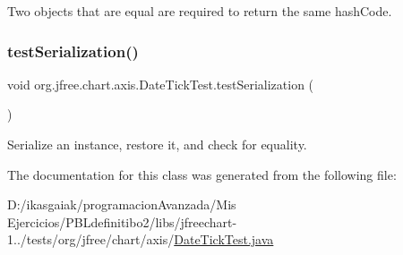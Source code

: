 Two objects that are equal are required to return the same hash\+Code. \mbox{\label{classorg_1_1jfree_1_1chart_1_1axis_1_1_date_tick_test_a82b4dd2de1f7e3f4c85b398b23a37e22}} 
\subsubsection{\texorpdfstring{test\+Serialization()}{testSerialization()}}
{\footnotesize\ttfamily void org.\+jfree.\+chart.\+axis.\+Date\+Tick\+Test.\+test\+Serialization (\begin{DoxyParamCaption}{ }\end{DoxyParamCaption})}

Serialize an instance, restore it, and check for equality. 

The documentation for this class was generated from the following file\+:\begin{DoxyCompactItemize}
\item 
D\+:/ikasgaiak/programacion\+Avanzada/\+Mis Ejercicios/\+P\+B\+Ldefinitibo2/libs/jfreechart-\/1../tests/org/jfree/chart/axis/\mbox{\hyperlink{_date_tick_test_8java}{Date\+Tick\+Test.\+java}}\end{DoxyCompactItemize}
